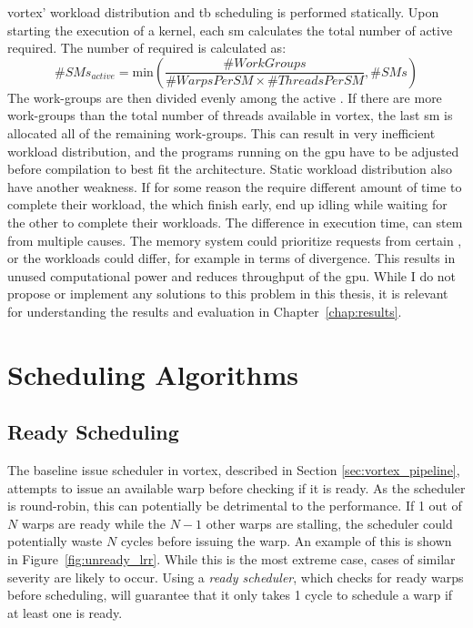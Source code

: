 \Gls{vortex}' workload distribution and \acrshort{tb} scheduling is performed statically. Upon starting the execution of a kernel, each \acrshort{sm} calculates the total number of active  required. The number of  required is calculated as:
\begin{equation}
    \#SMs_{active} = \text{min}(\frac{\#WorkGroups}{\#WarpsPerSM \times \#ThreadsPerSM}, \#SMs)
\end{equation}
\noindent
The work-groups are then divided evenly among the active . If there are more work-groups than the total number of threads available in \Gls{vortex}, the last \acrshort{sm} is allocated all of the remaining work-groups. This can result in very inefficient workload distribution, and the programs running on the \acrshort{gpu} have to be adjusted before compilation to best fit the architecture. Static workload distribution also have another weakness. If for some reason the  require different amount of time to complete their workload, the  which finish early, end up idling while waiting for the other  to complete their workloads. The difference in execution time, can stem from multiple causes. The memory system could prioritize requests from certain , or the workloads could differ, for example in terms of divergence. This results in unused computational power and reduces throughput of the \acrshort{gpu}. While I do not propose or implement any solutions to this problem in this thesis, it is relevant for understanding the results and evaluation in Chapter~\ref{chap:results}.

\section{Scheduling Algorithms}

\subsection{Ready Scheduling} \label{sec:ready_scheduling}

The baseline issue scheduler in \Gls{vortex}, described in Section \ref{sec:vortex_pipeline}, attempts to issue an available warp before checking if it is ready. As the scheduler is round-robin, this can potentially be detrimental to the performance. If 1 out of $N$ warps are ready while the $N-1$ other warps are stalling, the scheduler could potentially waste $N$ cycles before issuing the warp. An example of this is shown in Figure~\ref{fig:unready_lrr}. While this is the most extreme case, cases of similar severity are likely to occur. Using a \textit{ready scheduler}, which checks for ready warps before scheduling, will guarantee that it only takes 1 cycle to schedule a warp if at least one is ready.

